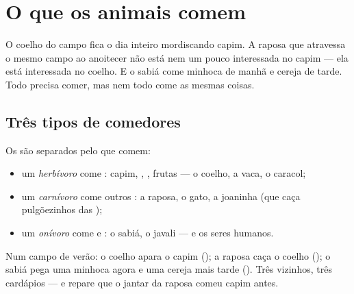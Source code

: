\chapter{O que os animais comem}\label{ch:g2:what-animals-eat}

O coelho do campo fica o dia inteiro mordiscando capim. A raposa que
atravessa o mesmo campo ao anoitecer não está nem um pouco
interessada no capim --- ela está interessada no coelho. E o sabiá
come minhoca de manhã e cereja de tarde. Todo  precisa comer,
mas nem todo  come as mesmas coisas.

\section{Três tipos de comedores}

\begin{definition}\label{def:g2:what-animals-eat:kinds}
Os  são separados pelo que comem:
\begin{itemize}
  \item um \emph{herbívoro} come : capim,
        , , frutas --- o coelho, a vaca, o caracol;
  \item um \emph{carnívoro} come outros : a
        raposa, o gato, a joaninha (que caça pulgõezinhos das
        );
  \item um \emph{onívoro} come  e : o
        sabiá, o javali --- e os seres humanos.
\end{itemize}
\end{definition}

\begin{example}\label{ex:g2:what-animals-eat:meadow}
Num campo de verão: o coelho apara o capim (); a raposa
caça o coelho (); o sabiá pega uma minhoca agora e uma
cereja mais tarde (). Três vizinhos, três cardápios --- e
repare que o jantar da raposa comeu capim antes.
\end{example}

